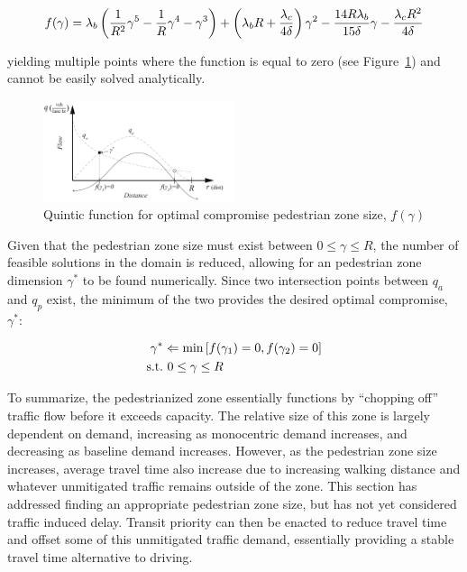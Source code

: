 \documentclass{elsarticle}\usepackage[]{graphicx}\usepackage[]{color}
\begin{document}
\begin{equation}\footnotesize
f(\gamma) = \lambda_{b}\left(\frac{1}{R^{2}}\gamma^{5}-\frac{1}{R}\gamma^{4}-\gamma^{3}\right)+\left(\lambda_{b}R+\frac{\lambda_{c}}{4\delta}\right)\gamma^{2}-\frac{14R\lambda_{b}}{15\delta}\gamma-\frac{\lambda_{c}R^{2}}{4\delta}
\end{equation}

\noindent yielding multiple points where the function is equal to zero (see Figure~\ref{fig:optimalped}) and cannot be easily solved analytically.

\begin{figure}[H]
     \centering
     \includegraphics[width=0.5\textwidth]{diagram_optimalped}
     \caption{Quintic function for optimal compromise pedestrian zone size, $f(\gamma)$}
     \label{fig:optimalped}
\end{figure}

Given that the pedestrian zone size must exist between $0 \leq \gamma \leq R$, the number of feasible solutions in the domain is reduced, allowing for an pedestrian zone dimension $\gamma^*$ to be found numerically. Since two intersection points between $q_a$ and $q_p$ exist, the minimum of the two provides the desired optimal compromise, $\gamma^*$:

\begin{align}\small
\gamma^* &\Leftarrow \text{min} \left[ f(\gamma_1) = 0, f(\gamma_2) = 0 \right]\\
\text{s.t.} & ~ 0 \leq \gamma\leq R  \notag 
\end{align}

To summarize, the pedestrianized zone essentially functions by ``chopping off'' traffic flow before it exceeds capacity. The relative size of this zone is largely dependent on demand, increasing as monocentric demand increases, and decreasing as baseline demand increases. However, as the pedestrian zone size increases, average travel time also increase due to increasing walking distance and whatever unmitigated traffic remains outside of the zone. This section has addressed finding an appropriate pedestrian zone size, but has not yet considered traffic induced delay. Transit priority can then be enacted to reduce travel time and offset some of this unmitigated traffic demand, essentially providing a stable travel time alternative to driving.
\end{document}
